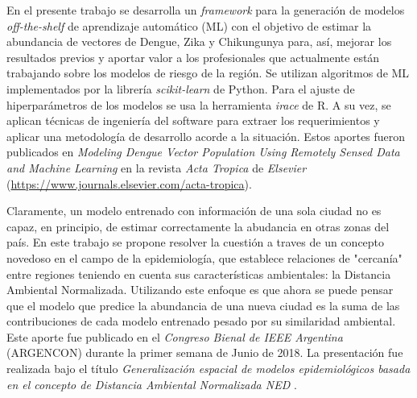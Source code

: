  \par En el presente trabajo se desarrolla un \textit{framework} para la generación
    de modelos \textit{off-the-shelf} de aprendizaje automático (ML) con el objetivo
    de estimar la abundancia de
    vectores de Dengue, Zika y Chikungunya para, así, mejorar los resultados
    previos y aportar valor a los profesionales que actualmente están trabajando
    sobre los modelos de riesgo de la región.
    Se utilizan algoritmos de ML implementados por la librería \textit{scikit-learn} de Python.
    Para el ajuste de hiperparámetros de los modelos se usa la herramienta
    \textit{irace} de R. A su vez, se aplican técnicas de ingeniería del software para
    extraer los requerimientos y aplicar una metodología de desarrollo acorde a la
    situación. Estos aportes fueron publicados en
    \textit{Modeling Dengue Vector Population Using Remotely Sensed Data and
    Machine Learning} \cite{scavuzzo2018modeling} en la revista \textit{Acta Tropica}
    de \textit{Elsevier} (\url{https://www.journals.elsevier.com/acta-tropica}).

  \par Claramente, un modelo entrenado con información de una sola ciudad no es capaz,
    en principio, de estimar correctamente la abudancia en otras zonas del país.
 En este trabajo
    se propone resolver la cuestión a traves de un concepto novedoso en el campo de la epidemiología, que establece
    relaciones de "cercanía" entre regiones teniendo en cuenta sus características
    ambientales: la Distancia Ambiental Normalizada. Utilizando este enfoque es que
    ahora se puede pensar que el modelo que predice la abundancia de una nueva ciudad es
    la suma de las contribuciones de cada modelo entrenado pesado por su similaridad ambiental.
    Este aporte fue publicado en el
    \textit{Congreso Bienal de IEEE Argentina} (ARGENCON) durante la primer semana de Junio
    de 2018. La presentación fue realizada bajo el título
    \textit{Generalización espacial de modelos epidemiológicos basada en el
    concepto de Distancia Ambiental Normalizada NED} \cite{ned_scavuzzo}.
